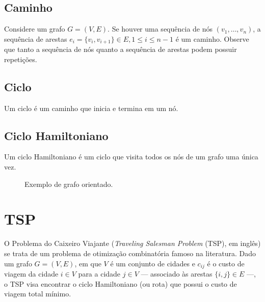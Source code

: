 \subsection{Caminho}
Considere um grafo \(G = (V, E)\). Se houver uma sequência de nós \((v_1, \dots, v_n)\), a sequência de arestas \(e_i = \{v_i, v_{i+1}\} \in E, 1 \leq  i \leq n-1\) é um caminho. Observe que tanto a sequência de nós quanto a sequência de arestas podem possuir repetições.

\subsection{Ciclo}
Um ciclo é um caminho que inicia e termina em um nó.

\subsection{Ciclo Hamiltoniano}
Um ciclo Hamiltoniano é um ciclo que visita todos os nós de um grafo uma única vez.

\begin{figure}[!htbp]
    \centering

    \caption{Exemplo de grafo orientado.}
    \label{fig:exemploGrafoOrientado}
\end{figure}

\section{TSP}
O Problema do Caixeiro Viajante (\textit{Traveling Salesman Problem} (TSP), em inglês) se trata de um problema de otimização combinatória famoso na literatura. Dado um grafo \(G = (V, E)\), em que \(V\) é um conjunto de cidades e \(c_{ij}\) é o custo de viagem da cidade \(i \in V\) para a cidade \(j \in V\) --- associado às arestas \(\{i, j\} \in E\) ---, o TSP visa  encontrar o ciclo Hamiltoniano (ou rota) que possui o custo de viagem total mínimo.

